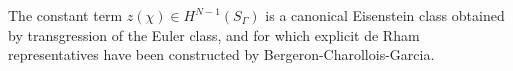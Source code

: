 \documentclass[a4paper,11pt]{amsart} %
\newcommand{\8}{\infty}
\newcommand{\vbf}{\mathbf{v}}
\newcommand{\four}{\pazocal{F}}
\newcommand{\SO}{\mathrm{SO}}
\newcommand{\SL}{\mathrm{SL}}
\newcommand{\GL}{\mathrm{GL}}
\newcommand{\HH}{\mathbb{H}}
\newcommand{\R}{\mathbb{R}}
\newcommand{\C}{\mathbb{C}}
\newcommand{\End}{\mathrm{End}}
\newcommand{\re}{\mathrm{Re}}
\theoremstyle{mytheoremstyle}
\newtheorem{thm}{Theorem}[section]
\theoremstyle{remark}
\numberwithin{equation}{section}
\begin{document}
The constant term $z(\chi) \in H^{N-1}(S_\Gamma)$ is a canonical Eisenstein class obtained by transgression of the Euler class, and for which explicit de Rham representatives have been constructed by Bergeron-Charollois-Garcia.

%
\end{document}
